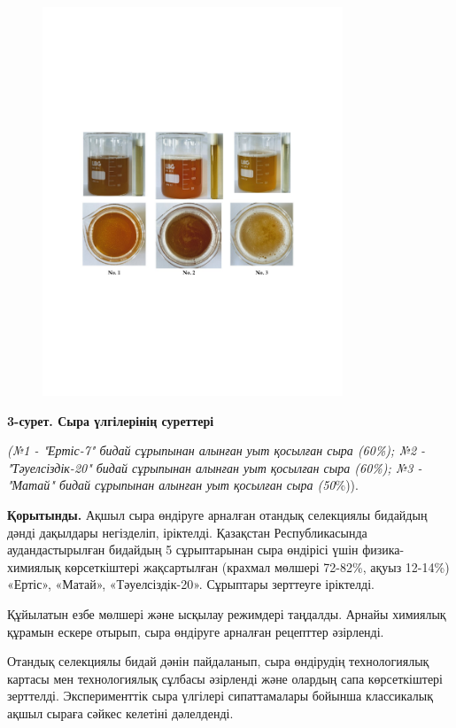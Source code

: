 \begin{figure}[H]
	\centering
	\includegraphics[width=0.8\textwidth]{media/pish3/image6}
	\caption*{}
\end{figure}


{\bfseries 3-сурет. Сыра үлгілерінің суреттері}

\emph{(№1 - "Ертіс-7" бидай сұрыпынан алынған уыт қосылған сыра (60\%);
№2 - "Тәуелсіздік-20" бидай сұрыпынан алынған уыт қосылған сыра (60\%);
№3 - "Матай" бидай сұрыпынан алынған уыт қосылған сыра (50}\%)).

{\bfseries Қорытынды.} Ақшыл сыра өндіруге арналған отандық селекциялы
бидайдың дәнді дақылдары негізделіп, іріктелді. Қазақстан
Республикасында аудандастырылған бидайдың 5 сұрыптарынан сыра өндірісі
үшін физика-химиялық көрсеткіштері жақсартылған (крахмал мөлшері
72-82\%, ақуыз 12-14\%) «Ертіс», «Матай», «Тәуелсіздік-20». Сұрыптары
зерттеуге іріктелді.

Құйылатын езбе мөлшері және ысқылау режимдері таңдалды. Арнайы химиялық
құрамын ескере отырып, сыра өндіруге арналған рецепттер әзірленді.

Отандық селекциялы бидай дәнін пайдаланып, сыра өндірудің технологиялық
картасы мен технологиялық сұлбасы әзірленді және олардың сапа
көрсеткіштері зерттелді. Эксперименттік сыра үлгілері сипаттамалары
бойынша классикалық ақшыл сыраға сәйкес келетіні дәлелденді.

